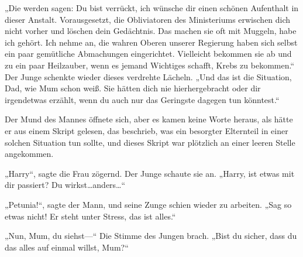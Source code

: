 „Die werden sagen: Du bist verrückt, ich wünsche dir einen schönen Aufenthalt in dieser Anstalt. Vorausgesetzt, die Obliviatoren des Ministeriums erwischen dich nicht vorher und löschen dein Gedächtnis. Das machen sie oft mit Muggeln, habe ich gehört. Ich nehme an, die wahren Oberen unserer Regierung haben sich selbst ein paar gemütliche Abmachungen eingerichtet. Vielleicht bekommen sie ab und zu ein paar Heilzauber, wenn es jemand Wichtiges schafft, Krebs zu bekommen.“
Der Junge schenkte wieder dieses verdrehte Lächeln.
„Und das ist die Situation, Dad, wie Mum schon weiß. Sie hätten dich nie hierhergebracht oder dir irgendetwas erzählt, wenn du auch nur das Geringste dagegen tun könntest.“

Der Mund des Mannes öffnete sich, aber es kamen keine Worte heraus, als hätte er aus einem Skript gelesen, das beschrieb, was ein besorgter Elternteil in einer solchen Situation tun sollte, und dieses Skript war plötzlich an einer leeren Stelle angekommen.



„Harry“, sagte die Frau zögernd. Der Junge schaute sie an. „Harry, ist etwas mit dir passiert? Du wirkst…anders…“

„Petunia!“, sagte der Mann, und seine Zunge schien wieder zu arbeiten. „Sag so etwas nicht! Er steht unter Stress, das ist alles.“

„Nun, Mum, du siehst—“ Die Stimme des Jungen brach. „Bist du sicher, dass du das alles auf einmal willst, Mum?“

